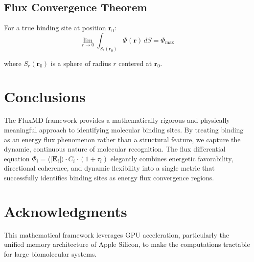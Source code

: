 \documentclass{article}
\begin{document}
\subsection{Flux Convergence Theorem}

For a true binding site at position $\mathbf{r}_0$:
\begin{equation}
\lim_{r \to 0} \int_{S_r(\mathbf{r}_0)} \Phi(\mathbf{r}) \, dS = \Phi_{\text{max}}
\end{equation}

where $S_r(\mathbf{r}_0)$ is a sphere of radius $r$ centered at $\mathbf{r}_0$.

\section{Conclusions}

The FluxMD framework provides a mathematically rigorous and physically meaningful approach to identifying molecular binding sites. By treating binding as an energy flux phenomenon rather than a structural feature, we capture the dynamic, continuous nature of molecular recognition. The flux differential equation $\Phi_i = \langle|\mathbf{E}_i|\rangle \cdot C_i \cdot (1 + \tau_i)$ elegantly combines energetic favorability, directional coherence, and dynamic flexibility into a single metric that successfully identifies binding sites as energy flux convergence regions.

\section{Acknowledgments}

This mathematical framework leverages GPU acceleration, particularly the unified memory architecture of Apple Silicon, to make the computations tractable for large biomolecular systems.
\end{document}
